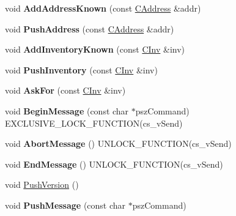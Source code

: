 \begin{DoxyCompactItemize}
\mbox{\label{class_c_node_a1d2cecdd03c9da642d292f6a81ac6ed8}} 
void {\bfseries Add\+Address\+Known} (const \mbox{\hyperlink{class_c_address}{C\+Address}} \&addr)
\item 
\mbox{\label{class_c_node_a06950a5ce265a1d4df1aad7f28e6fde8}} 
void {\bfseries Push\+Address} (const \mbox{\hyperlink{class_c_address}{C\+Address}} \&addr)
\item 
\mbox{\label{class_c_node_ac3054eb6ade84e8968f032ce3e700f6a}} 
void {\bfseries Add\+Inventory\+Known} (const \mbox{\hyperlink{class_c_inv}{C\+Inv}} \&inv)
\item 
\mbox{\label{class_c_node_a7cef2333aa8776127a7e7fcab659eb6a}} 
void {\bfseries Push\+Inventory} (const \mbox{\hyperlink{class_c_inv}{C\+Inv}} \&inv)
\item 
\mbox{\label{class_c_node_ae0def1498409407d1612833a7d38c875}} 
void {\bfseries Ask\+For} (const \mbox{\hyperlink{class_c_inv}{C\+Inv}} \&inv)
\item 
\mbox{\label{class_c_node_af76d193027757002321d0d674290b955}} 
void {\bfseries Begin\+Message} (const char $\ast$psz\+Command) E\+X\+C\+L\+U\+S\+I\+V\+E\+\_\+\+L\+O\+C\+K\+\_\+\+F\+U\+N\+C\+T\+I\+ON(cs\+\_\+v\+Send)
\item 
\mbox{\label{class_c_node_aae0fdfe555001a60bab8f216c3bc3978}} 
void {\bfseries Abort\+Message} () U\+N\+L\+O\+C\+K\+\_\+\+F\+U\+N\+C\+T\+I\+ON(cs\+\_\+v\+Send)
\item 
\mbox{\label{class_c_node_af8d4b8c0f883afffcb62d906c31b2cdf}} 
void {\bfseries End\+Message} () U\+N\+L\+O\+C\+K\+\_\+\+F\+U\+N\+C\+T\+I\+ON(cs\+\_\+v\+Send)
\item 
void \mbox{\hyperlink{class_c_node_a4dbfe4f6c1fd162aaa905e4bd201d536}{Push\+Version}} ()
\item 
\mbox{\label{class_c_node_a204fda3d33404cb37698c085b1583ab2}} 
void {\bfseries Push\+Message} (const char $\ast$psz\+Command)
\item 
\mbox{\label{class_c_node_a07f897794e362a214a1d4d2aa3d68939}} 

\end{DoxyCompactItemize}
